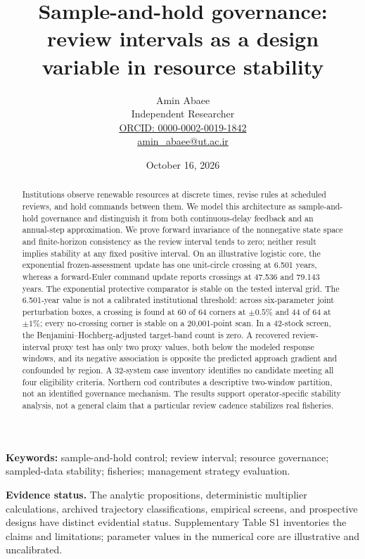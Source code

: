\documentclass[11pt]{article}
\begin{document}
\title{Sample-and-hold governance: review intervals as a design variable in resource stability}
\author{Amin Abaee\\[0.35em]
{\small Independent Researcher}\\[0.55em]
{\small\href{https://orcid.org/0000-0002-0019-1842}{ORCID: 0000-0002-0019-1842}}\\[0.3em]
{\small\href{mailto:amin\_abaee@ut.ac.ir}{amin\_abaee@ut.ac.ir}}}
\date{October 16, 2026}
\maketitle

\begin{abstract}
Institutions observe renewable resources at discrete times, revise rules at scheduled reviews, and hold commands between them. We model this architecture as sample-and-hold governance and distinguish it from both continuous-delay feedback and an annual-step approximation. We prove forward invariance of the nonnegative state space and finite-horizon consistency as the review interval tends to zero; neither result implies stability at any fixed positive interval. On an illustrative logistic core, the exponential frozen-assessment update has one unit-circle crossing at 6.501 years, whereas a forward-Euler command update reports crossings at 47.536 and 79.143 years. The exponential protective comparator is stable on the tested interval grid. The 6.501-year value is not a calibrated institutional threshold: across six-parameter joint perturbation boxes, a crossing is found at 60 of 64 corners at \(\pm0.5\%\) and 44 of 64 at \(\pm1\%\); every no-crossing corner is stable on a 20,001-point scan. In a 42-stock screen, the Benjamini--Hochberg-adjusted target-band count is zero. A recovered review-interval proxy test has only two proxy values, both below the modeled response windows, and its negative association is opposite the predicted approach gradient and confounded by region. A 32-system case inventory identifies no candidate meeting all four eligibility criteria. Northern cod contributes a descriptive two-window partition, not an identified governance mechanism. The results support operator-specific stability analysis, not a general claim that a particular review cadence stabilizes real fisheries.
\end{abstract}

\noindent\textbf{Keywords:} sample-and-hold control; review interval; resource governance; sampled-data stability; fisheries; management strategy evaluation.

\noindent\textbf{Evidence status.} The analytic propositions, deterministic multiplier calculations, archived trajectory classifications, empirical screens, and prospective designs have distinct evidential status. Supplementary Table S1 inventories the claims and limitations; parameter values in the numerical core are illustrative and uncalibrated.
\end{document}
